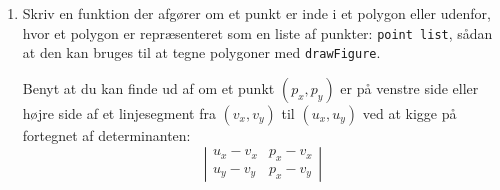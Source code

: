 \documentclass[a4paper,12pt]{article}
\begin{document}
\begin{enumerate}[{4N}1]
\item Skriv en funktion der afgører om et punkt er inde i et polygon
  eller udenfor, hvor et polygon er repræsenteret som en liste af
  punkter: \lstinline{point list}, sådan at den kan bruges til at
  tegne polygoner med \lstinline{drawFigure}.

  Benyt at du kan finde ud af om et punkt $(p_x, p_y)$ er på venstre
  side eller højre side af et linjesegment fra $(v_x, v_y)$ til $(u_x,
  u_y)$ ved at kigge på fortegnet af determinanten:
  \begin{equation*}
    \left|
      \begin{array}{ll}
        u_x-v_x & p_x-v_x \\
        u_y-v_y & p_x-v_y
      \end{array}
    \right|
  \end{equation*}
\end{enumerate}
\end{document}

